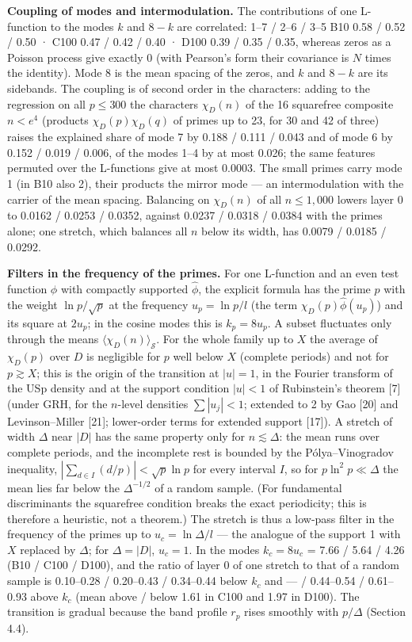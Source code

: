 \documentclass[
  10pt,
]{article}
\begin{document}
\textbf{Coupling of modes and intermodulation.} The contributions of one
L-function to the modes \(k\) and \(8 - k\) are correlated: 1--7 / 2--6
/ 3--5 B10 0.58 / 0.52 / 0.50 · C100 0.47 / 0.42 / 0.40 · D100 0.39 /
0.35 / 0.35, whereas zeros as a Poisson process give exactly 0 (with
Pearson's form their covariance is \(N\) times the identity). Mode 8 is
the mean spacing of the zeros, and \(k\) and \(8 - k\) are its
sidebands. The coupling is of second order in the characters: adding to
the regression on all \(p \le 300\) the characters \(\chi_D(n)\) of the
16 squarefree composite \(n < e^4\) (products \(\chi_D(p)\chi_D(q)\) of
primes up to 23, for 30 and 42 of three) raises the explained share of
mode 7 by 0.188 / 0.111 / 0.043 and of mode 6 by 0.152 / 0.019 / 0.006,
of the modes 1--4 by at most 0.026; the same features permuted over the
L-functions give at most 0.0003. The small primes carry mode 1 (in B10
also 2), their products the mirror mode --- an intermodulation with the
carrier of the mean spacing. Balancing on \(\chi_D(n)\) of all
\(n \le 1{,}000\) lowers layer 0 to 0.0162 / 0.0253 / 0.0352, against
0.0237 / 0.0318 / 0.0384 with the primes alone; one stretch, which
balances all \(n\) below its width, has 0.0079 / 0.0185 / 0.0292.

\textbf{Filters in the frequency of the primes.} For one L-function and
an even test function \(\phi\) with compactly supported \(\hat\phi\),
the explicit formula has the prime \(p\) with the weight
\(\ln p/\sqrt p\) at the frequency \(u_p = \ln p/l\) (the term
\(\chi_D(p)\hat\phi(u_p)\)) and its square at \(2u_p\); in the cosine
modes this is \(k_p = 8u_p\). A subset fluctuates only through the means
\(\langle\chi_D(n)\rangle_{\mathcal S}\). For the whole family up to
\(X\) the average of \(\chi_D(p)\) over \(D\) is negligible for \(p\)
well below \(X\) (complete periods) and not for \(p \gtrsim X\); this is
the origin of the transition at \(|u| = 1\), in the Fourier transform of
the USp density and at the support condition \(|u| < 1\) of Rubinstein's
theorem {[}7{]} (under GRH, for the \(n\)-level densities
\(\sum|u_j| < 1\); extended to 2 by Gao {[}20{]} and Levinson--Miller
{[}21{]}; lower-order terms for extended support {[}17{]}). A stretch of
width \(\Delta\) near \(|D|\) has the same property only for
\(n \lesssim \Delta\): the mean runs over complete periods, and the
incomplete rest is bounded by the Pólya--Vinogradov inequality,
\(|\sum_{d \in I}(d/p)| < \sqrt p\ln p\) for every interval \(I\), so
for \(p\ln^2 p \ll \Delta\) the mean lies far below the
\(\Delta^{-1/2}\) of a random sample. (For fundamental discriminants the
squarefree condition breaks the exact periodicity; this is therefore a
heuristic, not a theorem.) The stretch is thus a low-pass filter in the
frequency of the primes up to \(u_c = \ln\Delta/l\) --- the analogue of
the support 1 with \(X\) replaced by \(\Delta\); for \(\Delta = |D|\),
\(u_c = 1\). In the modes \(k_c = 8u_c\) = 7.66 / 5.64 / 4.26 (B10 /
C100 / D100), and the ratio of layer 0 of one stretch to that of a
random sample is 0.10--0.28 / 0.20--0.43 / 0.34--0.44 below \(k_c\) and
--- / 0.44--0.54 / 0.61--0.93 above \(k_c\) (mean above / below 1.61 in
C100 and 1.97 in D100). The transition is gradual because the band
profile \(r_p\) rises smoothly with \(p/\Delta\) (Section 4.4).
\end{document}
